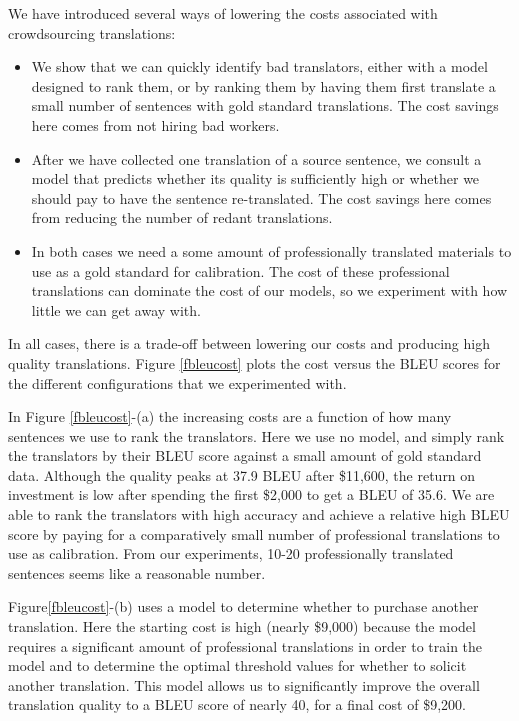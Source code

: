 \documentclass[11pt]{article}
\begin{document}
We have introduced several ways of lowering the costs associated with crowdsourcing translations:
\begin{itemize}
\item We show that we can quickly identify bad translators, either with a model designed to rank them, or by ranking them by having them first translate a small number of sentences with gold standard translations. The cost savings here comes from not hiring bad workers.
\item After we have collected one translation of a source sentence, we consult a model that predicts whether its quality is sufficiently high or whether we should pay to have the sentence re-translated.  The cost savings here comes from reducing the number of redant translations.
\item In both cases we need a some amount of professionally translated materials  to use as a gold standard for calibration.  The cost of these professional translations can dominate the cost of our models, so we experiment with how little we can get away with.
\end{itemize}
In all cases, there is a trade-off between lowering our costs and producing high quality translations.  Figure \ref{fbleucost} plots the cost versus the BLEU scores for the different configurations that we experimented with.

In Figure \ref{fbleucost}-(a) the increasing costs are a function of how many sentences we use to rank the translators.  Here we use no model, and simply rank the translators by their BLEU score against a small amount of gold standard data.  Although the quality peaks at 37.9 BLEU after \$11,600, the return on investment is low after spending the first \$2,000 to get a BLEU of 35.6.
We are able to rank the translators with high accuracy and achieve a relative high BLEU score by paying for a comparatively small number of professional translations to use as calibration.   From our experiments,  10-20 professionally translated sentences seems like a reasonable number. 

Figure\ref{fbleucost}-(b) uses a model to determine whether to purchase another translation.  Here the starting cost is high (nearly \$9,000) because the model requires a significant amount of professional translations in order to train the model and to determine the optimal threshold values for whether to solicit another translation. This model allows us to significantly improve the overall translation quality to a BLEU score of nearly 40, for a final cost of \$9,200.
\end{document}
